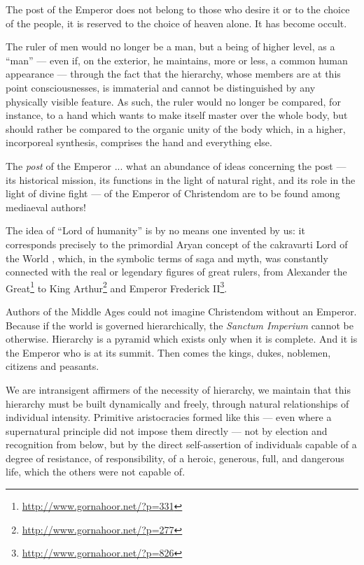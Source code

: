 \begin{quotationx}
The post of the Emperor does not belong to those who desire it or to the choice of the people, it is reserved to the choice of heaven alone. It has become occult.

The ruler of men would no longer be a man, but a being of higher level, as a ``man'' --- even if, on the exterior, he maintains, more or less, a common human appearance --- through the fact that the hierarchy, whose members are at this point consciousnesses, is immaterial and cannot be distinguished by any physically visible feature. As such, the ruler would no longer be compared, for instance, to a hand which wants to make itself master over the whole body, but should rather be compared to the organic unity of the body which, in a higher, incorporeal synthesis, comprises the hand and everything else.

The \emph{post} of the Emperor ... what an abundance of ideas concerning the post --- its historical mission, its functions in the light of natural right, and its role in the light of divine fight --- of the Emperor of Christendom are to be found among mediaeval authors!

The idea of ``Lord of humanity'' is by no means one invented by us: it corresponds precisely to the primordial Aryan concept of the cakravarti Lord of the World , which, in the symbolic terms of saga and myth, was constantly connected with the real or legendary figures of great rulers, from Alexander the Great\footnote{\url{http://www.gornahoor.net/?p=331}} to King Arthur\footnote{\url{http://www.gornahoor.net/?p=277}} and Emperor Frederick II\footnote{\url{http://www.gornahoor.net/?p=826}}.

Authors of the Middle Ages could not imagine Christendom without an Emperor. Because if the world is governed hierarchically, the \emph{Sanctum Imperium} cannot be otherwise. Hierarchy is a pyramid which exists only when it is complete. And it is the Emperor who is at its summit. Then comes the kings, dukes, noblemen, citizens and peasants.

We are intransigent affirmers of the necessity of hierarchy, we maintain that this hierarchy must be built dynamically and freely, through natural relationships of individual intensity. Primitive aristocracies formed like this --- even where a supernatural principle did not impose them directly --- not by election and recognition from below, but by the direct self-assertion of individuals capable of a degree of resistance, of responsibility, of a heroic, generous, full, and dangerous life, which the others were not capable of.


\end{quotationx}
